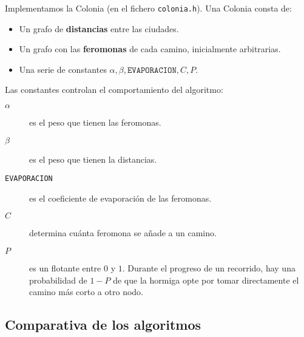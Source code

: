 Implementamos la Colonia (en el fichero \texttt{colonia.h}). Una Colonia consta de:

\begin{itemize}
  \item Un grafo de \textbf{distancias} entre las ciudades.
  \item Un grafo con las \textbf{feromonas} de cada camino, inicialmente arbitrarias.
  \item Una serie de constantes $\alpha, \beta, \texttt{EVAPORACION}, C, P$.
\end{itemize}

Las constantes controlan el comportamiento del algoritmo:

\begin{description}
  \item[$\alpha$] es el peso que tienen las feromonas.
  \item[$\beta$] es el peso que tienen la distancias.
  \item[\texttt{EVAPORACION}] es el coeficiente de evaporación de las feromonas.
  \item[$C$] determina cuánta feromona se añade a un camino.
  \item[$P$] es un flotante entre $0$ y $1$. Durante el progreso de un recorrido, hay
  una probabilidad de $1-P$ de que la hormiga opte por tomar directamente el camino
  más corto a otro nodo.
\end{description}

\subsection{Comparativa de los algoritmos}
